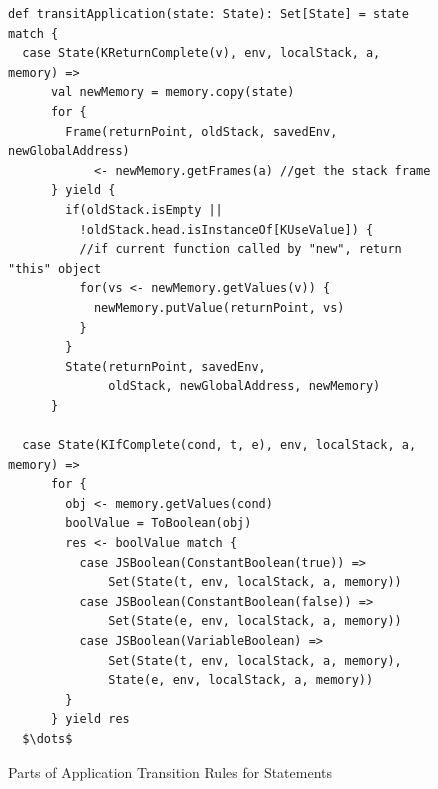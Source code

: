 \documentclass[12pt]{report}
\begin{document}
\begin{figure}
\lstset{language=Scala, mathescape}
\begin{lstlisting}
def transitApplication(state: State): Set[State] = state match {
  case State(KReturnComplete(v), env, localStack, a, memory) =>
      val newMemory = memory.copy(state)
      for {
        Frame(returnPoint, oldStack, savedEnv, newGlobalAddress)
            <- newMemory.getFrames(a) //get the stack frame
      } yield {
        if(oldStack.isEmpty ||
          !oldStack.head.isInstanceOf[KUseValue]) {
          //if current function called by "new", return "this" object
          for(vs <- newMemory.getValues(v)) {
            newMemory.putValue(returnPoint, vs)
          }
        }
        State(returnPoint, savedEnv,
              oldStack, newGlobalAddress, newMemory)
      }

  case State(KIfComplete(cond, t, e), env, localStack, a, memory) =>
      for {
        obj <- memory.getValues(cond)
        boolValue = ToBoolean(obj)
        res <- boolValue match {
          case JSBoolean(ConstantBoolean(true)) =>
              Set(State(t, env, localStack, a, memory))
          case JSBoolean(ConstantBoolean(false)) =>
              Set(State(e, env, localStack, a, memory))
          case JSBoolean(VariableBoolean) =>
              Set(State(t, env, localStack, a, memory),
              State(e, env, localStack, a, memory))
        }
      } yield res
  $\dots$

\end{lstlisting}
\caption{Parts of Application Transition Rules for Statements}
\label{fig:app-stmt}
\end{figure}
\end{document}
